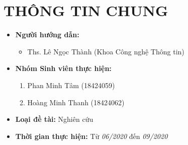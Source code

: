 \documentclass{article}[14pt]
\begin{document}
    \vspace{.5cm}
    
    \Large
    \section{THÔNG TIN CHUNG}
    \begin{itemize}[label = {}]
        
        \item \textbf{Người hướng dẫn:} 
        \begin{itemize}
            \item Ths. Lê Ngọc Thành (Khoa Công nghệ Thông tin)
        \end{itemize}{}
    
        
        \item \textbf{Nhóm Sinh viên thực hiện:}
        
        \begin{enumerate}
        
            \item Phan Minh Tâm (18424059)
            \item Hoàng Minh Thanh (18424062)
        \end{enumerate}

        \item \textbf{Loại đề tài:} Nghiên cứu
        
        \item \textbf{Thời gian thực hiện:} Từ \textit{06/2020} đến \textit{09/2020}
        
        
    \end{itemize}
    
\end{document}

